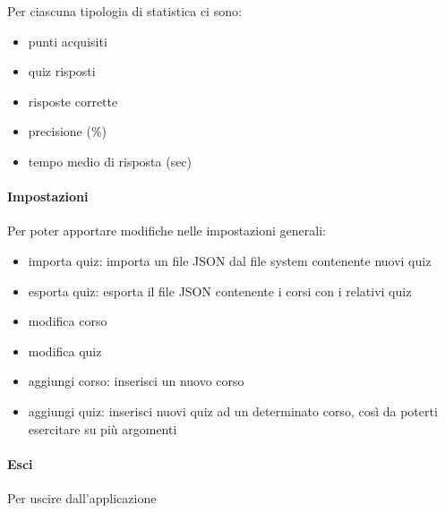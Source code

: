 Per ciascuna tipologia di statistica ci sono:
\begin{itemize}
    \item punti acquisiti
    \item quiz risposti
    \item risposte corrette
    \item precisione (\%)
    \item tempo medio di risposta (sec)
\end{itemize}

\paragraph{Impostazioni}
Per poter apportare modifiche nelle impostazioni generali:
\begin{itemize}
    \item importa quiz: importa un file JSON dal file system contenente nuovi quiz
    \item esporta quiz: esporta il file JSON contenente i corsi con i relativi quiz
    \item modifica corso
    \item modifica quiz
    \item aggiungi corso: inserisci un nuovo corso
    \item aggiungi quiz: inserisci nuovi quiz ad un determinato corso, così da poterti esercitare su più argomenti
\end{itemize}

\paragraph{Esci}
Per uscire dall'applicazione